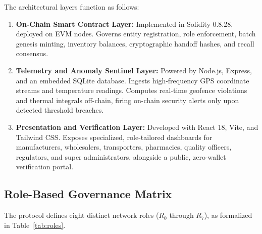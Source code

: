 \documentclass[pdflatex,sn-mathphys-num]{sn-jnl}
\theoremstyle{thmstyleone}
\theoremstyle{thmstyletwo}
\theoremstyle{thmstylethree}
\begin{document}
The architectural layers function as follows:
\begin{enumerate}
    \item \textbf{On-Chain Smart Contract Layer:} Implemented in Solidity 0.8.28, deployed on EVM nodes. Governs entity registration, role enforcement, batch genesis minting, inventory balances, cryptographic handoff hashes, and recall consensus.
    \item \textbf{Telemetry and Anomaly Sentinel Layer:} Powered by Node.js, Express, and an embedded SQLite database. Ingests high-frequency GPS coordinate streams and temperature readings. Computes real-time geofence violations and thermal integrals off-chain, firing on-chain security alerts only upon detected threshold breaches.
    \item \textbf{Presentation and Verification Layer:} Developed with React 18, Vite, and Tailwind CSS. Exposes specialized, role-tailored dashboards for manufacturers, wholesalers, transporters, pharmacies, quality officers, regulators, and super administrators, alongside a public, zero-wallet verification portal.
\end{enumerate}

\subsection{Role-Based Governance Matrix}

The protocol defines eight distinct network roles ($R_0$ through $R_7$), as formalized in Table~\ref{tab:roles}.
\end{document}

